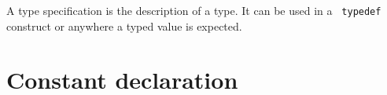 \smallbreak



\bigbreak

A type specification is the description of a type. It can be used in a {\tt
typedef} construct or anywhere a typed value is expected.

\smallbreak











\section{Constant declaration}
\label{sec:iff:const}

\smallbreak
